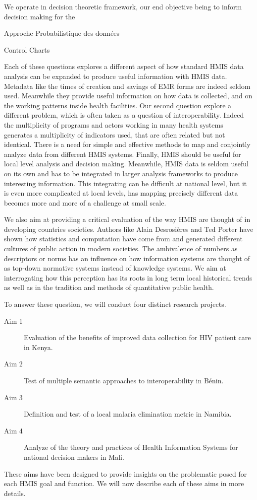 We operate in decision theoretic framework, our end objective being to inform decision making for the

Approche Probabilistique des données

Control Charts

Each of these questions explores a different aspect of how standard HMIS data analysis can be expanded to produce useful information with HMIS data. Metadata like the times of creation and savings of EMR forms are indeed seldom used. Meanwhile they provide useful information on how data is collected, and on the working patterns inside health facilities. Our second question explore a different problem, which is often taken as a question of interoperability. Indeed the multiplicity of programs and actors working in many health systems generates a multiplicity of indicators used, that are often related but not identical. There is a need for simple and effective methods to map and conjointly analyze data from different HMIS systems. Finally, HMIS should be useful for local level analysis and decision making. Meanwhile, HMIS data is seldom useful on its own and has to be integrated in larger analysis frameworks to produce interesting information. This integrating can be difficult at national level, but it is even more complicated at local levels, has mapping precisely different data becomes more and more of a challenge at small scale.

We also aim at providing a critical evaluation of the way HMIS are thought of in developing countries societies. Authors like Alain Desrosières and Ted Porter have shown how statistics and computation have come from and generated different cultures of public action in modern societies. The ambivalence of numbers as descriptors or norms has an influence on how information systems are thought of as top-down normative systems instead of knowledge systems. We aim at interrogating how this perception has its roots in long term local historical trends as well as in the tradition and methods of quantitative public health.


To answer these question, we will conduct four distinct research projects.
\begin{description}
    \item[Aim 1] Evaluation of the benefits of improved data collection for HIV patient care in Kenya.
    \item[Aim 2] Test of multiple semantic approaches to interoperability in Bénin.
    \item[Aim 3] Definition and test of a local malaria elimination metric in Namibia.
    \item[Aim 4] Analyze of the theory and practices of Health Information Systems for national decision makers in Mali.
\end{description}

These aims have been designed to provide insights on the problematic posed for each HMIS goal and function. We will now describe each of these aims in more details.
